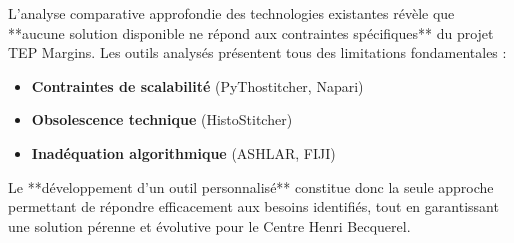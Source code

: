 L'analyse comparative approfondie des technologies existantes révèle que **aucune solution disponible ne répond aux contraintes spécifiques** du projet TEP Margins. Les outils analysés présentent tous des limitations fondamentales :

\begin{itemize}[leftmargin=*]
    \item \textbf{Contraintes de scalabilité} (PyThostitcher, Napari)
    \item \textbf{Obsolescence technique} (HistoStitcher)
    \item \textbf{Inadéquation algorithmique} (ASHLAR, FIJI)
\end{itemize}

Le **développement d'un outil personnalisé** constitue donc la seule approche permettant de répondre efficacement aux besoins identifiés, tout en garantissant une solution pérenne et évolutive pour le Centre Henri Becquerel.